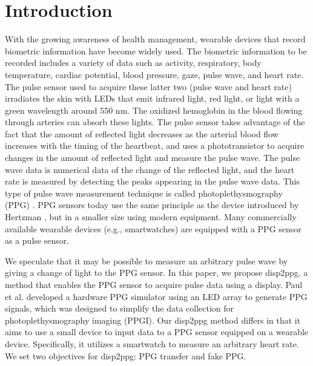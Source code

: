 \documentclass[sigchi,authordraft]{acmart}
\begin{document}
\section{Introduction}
\label{sec:introduction}
With the growing awareness of health management, wearable devices that record biometric information have become widely used. The biometric information to be recorded includes a variety of data such as activity, respiratory, body temperature, cardiac potential, blood pressure, gaze, pulse wave, and heart rate. The pulse sensor used to acquire these latter two (pulse wave and heart rate) irradiates the skin with LEDs that emit infrared light, red light, or light with a green wavelength around 550 nm. The oxidized hemoglobin in the blood flowing through arteries can absorb these lights. The pulse sensor takes advantage of the fact that the amount of reflected light decreases as the arterial blood flow increases with the timing of the heartbeat, and uses a phototransistor to acquire changes in the amount of reflected light and measure the pulse wave. The pulse wave data is numerical data of the change of the reflected light, and the heart rate is measured by detecting the peaks appearing in the pulse wave data. This type of pulse wave measurement technique is called photoplethysmography (PPG) \cite{ppg}. PPG sensors today use the same principle as the device introduced by Hertzman \cite{ppg_principle1, ppg_principle2}, but in a smaller size using modern equipment. Many commercially available wearable devices (e.g., smartwatches) are equipped with a PPG sensor as a pulse sensor.\par

We speculate that it may be possible to measure an arbitrary pulse wave by giving a change of light to the PPG sensor. In this paper, we propose disp2ppg, a method that enables the PPG sensor to acquire pulse data using a display. Paul et al. \cite{ppg_generator} developed a hardware PPG simulator using an LED array to generate PPG signals, which was designed to simplify the data collection for photoplethysmography imaging (PPGI). Our disp2ppg method differs in that it aims to use a small device to input data to a PPG sensor equipped on a wearable device. Specifically, it utilizes a smartwatch to measure an arbitrary heart rate. We set two objectives for disp2ppg: PPG transfer and fake PPG.\par
\end{document}
